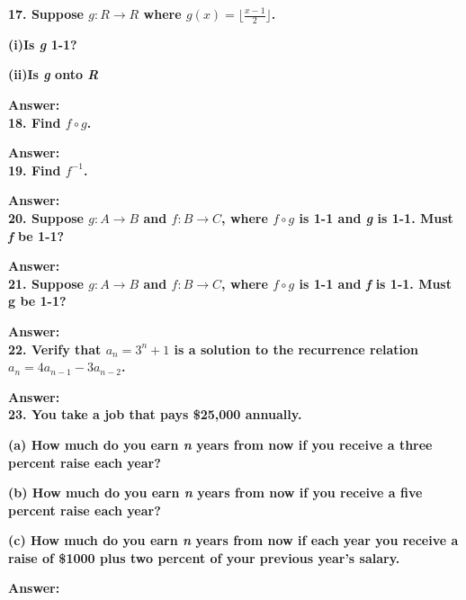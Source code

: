 \documentclass{article}
\begin{document}
\begin{large}
\textbf{17. Suppose $g:R\to R$ where $g(x)=\lfloor \frac{x-1}{2}\rfloor$.}

\textbf{(i)Is \emph{g} 1-1?}

\textbf{(ii)Is \emph{g} onto \emph{R}}

\textbf{Answer:} \\




\textbf{18. Find $f\circ g$.} 


\textbf{Answer:} \\




\textbf{19. Find $f^{-1}$.}

\textbf{Answer:} \\




\textbf{20. Suppose $g:A\to B$ and $f:B\to C$, where $f\circ g$ is 1-1 and \emph{g} is 1-1. Must \emph{f} be 1-1?}

\textbf{Answer:} \\





\textbf{21. Suppose $g:A\to B$ and $f:B\to C$, where $f\circ g$ is 1-1 and \emph{f} is 1-1. Must g be 1-1?}

\textbf{Answer:} \\




\textbf{22. Verify that $a_{n}={3^{n}+1}$ is a solution to the recurrence relation $a_{n}=4a_{n-1}-3a_{n-2}$.}

\textbf{Answer:} \\





\textbf{23. You take a job that pays \$25,000 annually.}

\textbf{(a) How much do you earn \emph{n} years from now if you receive a three percent raise each year?}

\textbf{(b) How much do you earn \emph{n} years from now if you receive a five percent raise each year? }

\textbf{(c) How much do you earn \emph{n} years from now if each year you receive a raise of \$1000 plus two percent of your previous year's salary.}

\textbf{Answer:} \\








\end{large}
\end{document}
